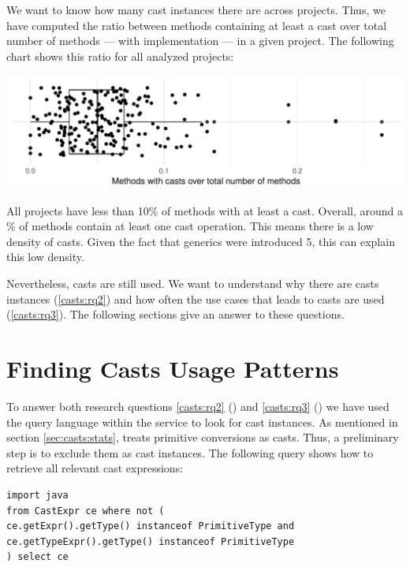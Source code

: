 We want to know how many cast instances there are across projects.
Thus, we have computed the ratio between methods containing
at least a cast over total number of methods --- with implementation --- in a given project.
The following chart shows this ratio for all analyzed projects:

\includegraphics[width=0.9\columnwidth]{analysis/stats-methodwcastXproject.pdf}

All projects have less than 10\% of methods with at least a cast.
Overall, around a \castpercentage{}\% of methods contain at least one cast operation. 
This means there is a low density of casts.
Given the fact that generics were introduced \java{} 5, this can explain this low density.

Nevertheless, casts are still used.
We want to understand why there are casts instances (\ref{casts:rq2}) and how often the use cases that leads to casts are used (\ref{casts:rq3}).
The following sections give an answer to these questions.


\section{Finding Casts Usage Patterns}
\label{sec:casts:methodology}

To answer both research questions
\ref{casts:rq2} (\emph{\crqB}) and \ref{casts:rq3} (\emph{\crqC})
we have used the \ql{} query language within the \lgtm{} service to look for cast instances.
%
As mentioned in section \ref{sec:casts:stats}, \ql{} treats primitive conversions as casts.
Thus, a preliminary step is to exclude them as cast instances.
The following \ql{} query shows how to retrieve all relevant cast expressions:

\begin{lstlisting}[style=ql,caption=\ql{} query to retrieve all relevant cast expressions.]
import java
from CastExpr ce where not (
ce.getExpr().getType() instanceof PrimitiveType and
ce.getTypeExpr().getType() instanceof PrimitiveType
) select ce
\end{lstlisting}

